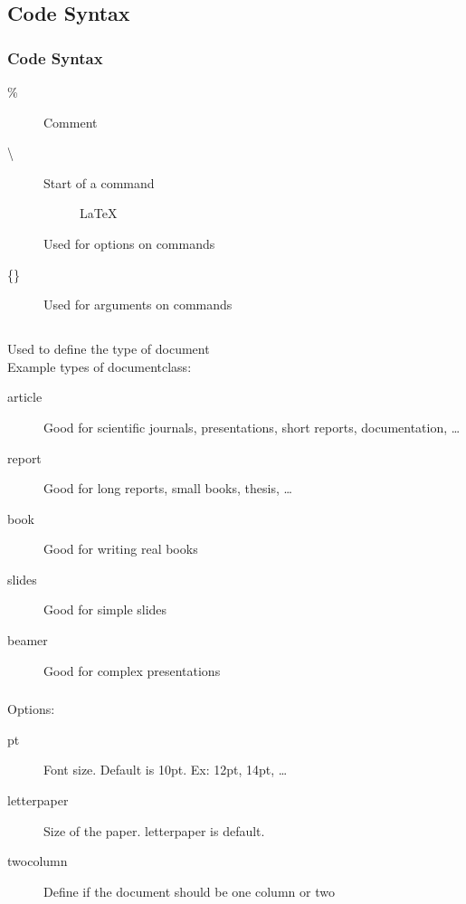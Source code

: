 
\subsection{Code Syntax}

\begin{frame}
\frametitle{Code Syntax}
    \begin{description}
        \item[\%] Comment
        \item[\textbackslash] Start of a command
        \begin{description}
            \item[] \LaTeX
        \end{description}
        \item[\brackets{}] Used for options on commands
        \item[\{\}] Used for arguments on commands
    \end{description}
\end{frame}




\subsection{}

\begin{frame}
\frametitle{}
    Used to define the type of document\\
    Example types of documentclass:
    \begin{description}
        \item[article] Good for scientific journals, presentations, short reports, documentation, \ldots
        \item[report] Good for long reports, small books, thesis, \ldots
        \item[book] Good for writing real books
        \item[slides] Good for simple slides
        \item[beamer] Good for complex presentations
    \end{description}
\end{frame}


\begin{frame}
\frametitle{}
    Options:
    \begin{description}
        \item[pt] Font size. Default is 10pt. Ex: 12pt, 14pt, \ldots
        \item[letterpaper] Size of the paper. letterpaper is default.
        \item[twocolumn] Define if the document should be one column or two
    \end{description}
\end{frame}




